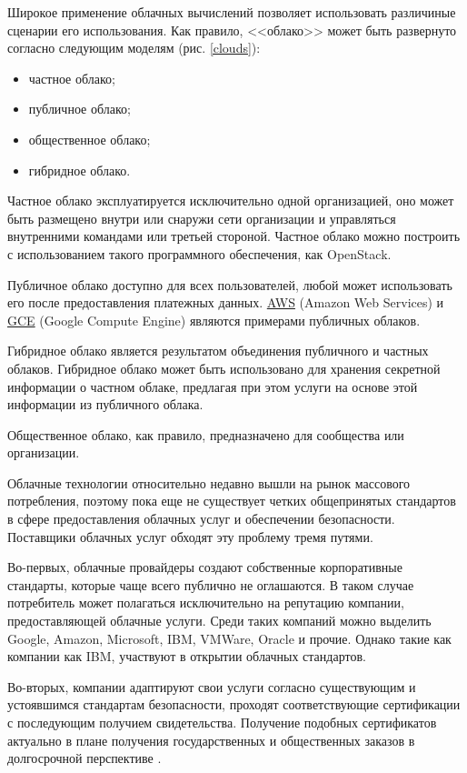 Широкое применение облачных вычислений позволяет использовать различиные сценарии его использования.
Как правило, <<облако>> может быть развернуто согласно следующим моделям (рис. \ref{clouds}):
\begin{itemize}
  \item частное облако;
  \item публичное облако;
  \item общественное облако;
  \item гибридное облако.
\end{itemize}


Частное облако эксплуатируется исключительно одной организацией, оно может быть размещено внутри или снаружи сети организации и управляться внутренними командами или третьей стороной.
Частное облако можно построить с использованием такого программного обеспечения, как OpenStack.

Публичное облако доступно для всех пользователей, любой может использовать его после предоставления платежных данных.
\hyperlink{aws}{AWS} (Amazon Web Services) и \hyperlink{gce}{GCE} (Google Compute Engine) являются примерами публичных облаков.

Гибридное облако является результатом объединения публичного и частных облаков.
Гибридное облако может быть использовано для хранения секретной информации о частном облаке, предлагая при этом услуги на основе этой информации из публичного облака.

Общественное облако, как правило, предназначено для сообщества или организации.

Облачные технологии относительно недавно вышли на рынок массового потребления, поэтому пока еще не существует четких общепринятых стандартов в сфере предоставления облачных услуг и обеспечении безопасности.
Поставщики облачных услуг обходят эту проблему тремя путями.

Во-первых, облачные провайдеры создают собственные корпоративные стандарты, которые чаще всего публично не оглашаются.
В таком случае потребитель может полагаться исключительно на репутацию компании, предоставляющей облачные услуги.
Среди таких компаний можно выделить Google, Amazon, Microsoft, IBM, VMWare, Oracle и прочие.
Однако такие как компании как IBM, участвуют в открытии облачных стандартов.

Во-вторых, компании адаптируют свои услуги согласно существующим и устоявшимся стандартам безопасности, проходят соответствующие сертификации с последующим получием свидетельства.
Получение подобных сертификатов актуально в плане получения государственных и общественных заказов в долгосрочной перспективе \cite{itmo}.

